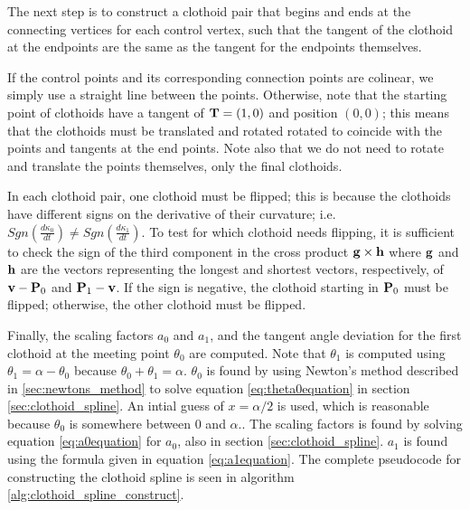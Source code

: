 The next step is to  construct a clothoid pair that begins and ends at the connecting vertices for each control vertex, such that the tangent of the clothoid at the endpoints are the same as the tangent for the endpoints themselves. 

If the control points and its corresponding connection points are colinear, we simply use a straight line between the points. Otherwise, note that the starting point of clothoids have a tangent of ${\mathbf T} = (1,0)$ and position $(0,0)$; this means that the clothoids must be translated and rotated rotated  to coincide with the points and tangents at the end points. Note also that we do not need to rotate and translate the points themselves, only the final clothoids. 

In each clothoid pair, one clothoid must be flipped; this is because the clothoids have different signs on the derivative of their curvature; i.e. $Sgn(\frac{d\kappa_{0}}{dt})\neq Sgn(\frac{d\kappa_{1}}{dt})$.  To test for which clothoid needs flipping, it is sufficient to check the sign of the third component in the cross product ${\mathbf g}\times {\mathbf h}$ where ${\mathbf g}$ and ${\mathbf h}$ are the vectors representing the longest and shortest vectors, respectively, of ${\mathbf v}-{\mathbf P}_0$ and ${\mathbf P}_1 - {\mathbf v}$. If the sign is negative, the clothoid starting in ${\mathbf P}_0$ must be flipped; otherwise, the other clothoid must be flipped.

Finally, the scaling factors $a_0$ and $a_1$, and the tangent angle deviation for the first clothoid at the meeting point $\theta_0$ are computed. Note that $\theta_1$ is computed using $\theta_1 = \alpha - \theta_0$ because $\theta_0 + \theta_1 = \alpha$\cite{clothoid}. $\theta_0$ is found by using Newton's method described in \ref{sec:newtons_method} to solve equation \ref{eq:theta0equation} in section \ref{sec:clothoid_spline}. An intial guess of $x=\alpha/2$ is used, which is reasonable because $\theta_0$ is somewhere between $0$ and $\alpha$.\cite{clothoid}. The scaling factors is found by solving equation \ref{eq:a0equation} for $a_0$, also in section \ref{sec:clothoid_spline}. $a_1$ is found using the formula given in equation \ref{eq:a1equation}. The complete pseudocode for constructing the clothoid spline is seen in algorithm \ref{alg:clothoid_spline_construct}.

